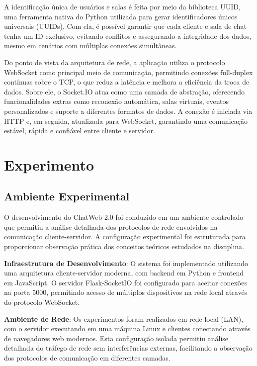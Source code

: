 \documentclass[conference,compsoc]{IEEEtran}
\begin{document}
\begin{otherlanguage}{brazil}
A identificação única de usuários e salas é feita por meio da biblioteca UUID, uma ferramenta nativa do Python utilizada para gerar identificadores únicos universais (UUIDs). Com ela, é possível garantir que cada cliente e sala de chat tenha um ID exclusivo, evitando conflitos e assegurando a integridade dos dados, mesmo em cenários com múltiplas conexões simultâneas.

Do ponto de vista da arquitetura de rede, a aplicação utiliza o protocolo WebSocket como principal meio de comunicação, permitindo conexões full-duplex contínuas sobre o TCP, o que reduz a latência e melhora a eficiência da troca de dados. Sobre ele, o Socket.IO atua como uma camada de abstração, oferecendo funcionalidades extras como reconexão automática, salas virtuais, eventos personalizados e suporte a diferentes formatos de dados. A conexão é iniciada via HTTP e, em seguida, atualizada para WebSocket, garantindo uma comunicação estável, rápida e confiável entre cliente e servidor.

\section{Experimento}

\subsection{Ambiente Experimental}

O desenvolvimento do ChatWeb 2.0 foi conduzido em um ambiente controlado que permitiu a análise detalhada dos protocolos de rede envolvidos na comunicação cliente-servidor. A configuração experimental foi estruturada para proporcionar observação prática dos conceitos teóricos estudados na disciplina.

\textbf{Infraestrutura de Desenvolvimento}:
O sistema foi implementado utilizando uma arquitetura cliente-servidor moderna, com backend em Python e frontend em JavaScript. O servidor Flask-SocketIO foi configurado para aceitar conexões na porta 5000, permitindo acesso de múltiplos dispositivos na rede local através do protocolo WebSocket.

\textbf{Ambiente de Rede}:
Os experimentos foram realizados em rede local (LAN), com o servidor executando em uma máquina Linux e clientes conectando através de navegadores web modernos. Esta configuração isolada permitiu análise detalhada do tráfego de rede sem interferências externas, facilitando a observação dos protocolos de comunicação em diferentes camadas.


\end{otherlanguage}
\end{document}
